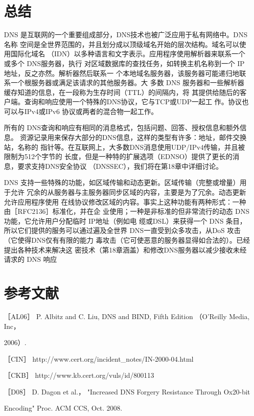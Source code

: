 \section{总结}

DNS 是互联网的一个重要组成部分，DNS技术也被广泛应用于私有网络中。DNS名称
空间是全世界范围的，并且划分成以顶级域名开始的层次结构。域名可以使用国际化域名
（IDN）以多种语言和文字表示。应用程序使用解析器来联系一个或多个 DNS服务器，执行
对区域数据库的查找任务，如转换主机名称到一个 IP 地址，反之亦然。解析器然后联系一
个本地域名服务器，该服务器可能递归地联系一个根服务器或满足该请求的其他服务器。大
多数 DNS 服务器和一些解析器缓存知道的信息，在一段称为生存时间（TTL）的间隔内，将
其提供给随后的客户端。查询和响应使用一个特殊的DNS协议，它与TCP或UDP一起工
作。协议也可以与IPv4或IPv6 协议或两者的混合物一起工作。

所有的 DNS查询和响应有相同的消息格式，包括问题、回答、授权信息和额外信息。
资源记录用来保存大部分的DNS信息，这样的类型有许多：地址，邮件交换站，名称的
指针等。在互联网上，大多数DNS消息使用UDP/IPv4传输，并且被限制为512个字节的
长度，但是一种特的扩展选项（EDNSO）提供了更长的消息，要求支持DNS安全协议
（DNSSEC），我们将在第18章中详细讨论。

DNS 支持一些特殊的功能，如区域传输和动态更新。区域传输（完整或增量）用于允许
冗余的从服务器与主服务器同步区域的内容，主要是为了冗余。动态更新允许应用程序使用
在线协议修改区域的内容。事实上这种功能有两种形式：一种由［RFC2136］标准化，并在企
业使用；一种是非标准的但非常流行的动态 DNS功能，它允许用户分配临时 IP地址（例如电
缆或DSL）来获得一个 DNS 条目，所以它们提供的服务可以通过遍及全世界
DNS一直受到众多攻击，从DoS 攻击（它使得DNS仅有有限的能力
毒攻击（它可使恶意的服务器显得如合法的）。已经提出各种技术来解决这
密技术（第18章涵盖）和修改DNS服务器以减少接收未经请求的 DNS 响应

\section{参考文献}

［AL06］ P. Albitz and C. Liu, DNS and BIND, Fifth Edition （O'Reilly Media, Inc，

2006）.

［CIN］ http://www.cert.org/incident\_notes/IN-2000-04.html

［CKB］ http://www.kb.cert.org/vuls/id/800113

［D08］ D. Dagon et al.， "Increased DNS Forgery Resistance Through Ox20-bit

Encoding" Proc. ACM CCS, Oct. 2008.

